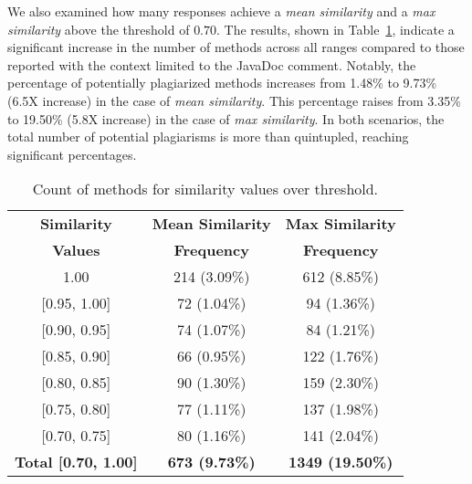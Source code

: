 We also examined how many responses achieve a \textit{mean similarity} and a \textit{max similarity} above the threshold of $0.70$. The results, shown in Table~\ref{tab:count_methods_similarity_file}, indicate a significant increase in the number of methods across all ranges compared to those reported with the context limited to the JavaDoc comment. Notably, the percentage of potentially plagiarized methods increases from 1.48\% to 9.73\% (6.5X increase) in the case of \textit{mean similarity}. This percentage raises from 3.35\% to 19.50\% (5.8X increase) in the case of \textit{max similarity}. In both scenarios, the total number of potential plagiarisms is more than quintupled, reaching significant percentages.

\begin{table}[ht] \begin{center}
\caption{Count of methods for similarity values over threshold.}
\begin{tabular}{c|c|c}
\toprule
\textbf{Similarity}             & \textbf{Mean Similarity} & \textbf{Max Similarity} \\
\textbf{Values}                 & \textbf{Frequency}       & \textbf{Frequency}      \\ \midrule
1.00                            & 214 (3.09\%)             & 612 (8.85\%)            \\
{[}0.95, 1.00{]}                & 72 (1.04\%)              & 94 (1.36\%)             \\
{[}0.90, 0.95{]}                & 74 (1.07\%)              & 84 (1.21\%)             \\
{[}0.85, 0.90{]}                & 66 (0.95\%)              & 122 (1.76\%)            \\
{[}0.80, 0.85{]}                & 90 (1.30\%)              & 159 (2.30\%)            \\
{[}0.75, 0.80{]}                & 77 (1.11\%)              & 137 (1.98\%)            \\
{[}0.70, 0.75{]}                & 80 (1.16\%)              & 141 (2.04\%)            \\ \midrule
\textbf{Total {[}0.70, 1.00{]}} & \textbf{673 (9.73\%)}    & \textbf{1349 (19.50\%)} \\ \bottomrule
\end{tabular}

 \label{tab:count_methods_similarity_file}
\end{center}\end{table}

